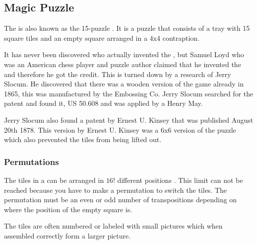 \subsection{Magic Puzzle}
The \mpuzzle{} is also known as the 15-puzzle \cite[pp. 48-50]{Larsen81}. It is a puzzle that consists of a tray with 15 square tiles and an empty square arranged in a 4x4 contraption.

It has never been discovered who actually invented the \mpuzzle{}, but Samuel Loyd who was an American chess player and puzzle author claimed that he invented the \mpuzzle{} and therefore he got the credit. This is turned down by a research of Jerry Slocum. He discovered that there was a wooden version of the game already in 1865, this was manufactured by the Embossing Co. Jerry Slocum searched for the patent and found it, US 50.608 and was applied by a Henry May. 

Jerry Slocum also found a patent by Ernest U. Kinsey that was published August 20th 1878. This version by Ernest U. Kinsey was a 6x6 version of the puzzle which also prevented the tiles from being lifted out.

\subsubsection {Permutations}
The tiles in a \mpuzzle{} can be arranged in $16!$ different positions \cite{jaapsch}. This limit can not be reached because you have to make a permutation to switch the tiles. The permutation must be an even or odd number of transpositions depending on where the position of the empty square is.

The tiles are often numbered or labeled with small pictures which when assembled correctly form a larger picture.

